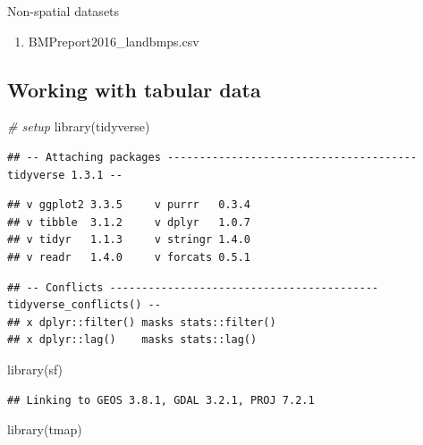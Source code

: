 \documentclass[]{article}
\newenvironment{Shaded}{\begin{snugshade}}{\end{snugshade}}
\newcommand{\CommentTok}[1]{\textcolor[rgb]{0.56,0.35,0.01}{\textit{#1}}}
\newcommand{\FunctionTok}[1]{\textcolor[rgb]{0.00,0.00,0.00}{#1}}
\newcommand{\NormalTok}[1]{#1}
\providecommand{\tightlist}{%
  \setlength{\itemsep}{0pt}\setlength{\parskip}{0pt}}
\begin{document}
Non-spatial datasets

\begin{enumerate}
\def\labelenumi{\arabic{enumi}.}
\tightlist
\item
  BMPreport2016\_landbmps.csv
\end{enumerate}

\hypertarget{working-with-tabular-data}{%
\subsection{Working with tabular data}\label{working-with-tabular-data}}

\begin{Shaded}
\begin{Highlighting}[]
\CommentTok{\# setup}
\FunctionTok{library}\NormalTok{(tidyverse)}
\end{Highlighting}
\end{Shaded}

\begin{verbatim}
## -- Attaching packages --------------------------------------- tidyverse 1.3.1 --
\end{verbatim}

\begin{verbatim}
## v ggplot2 3.3.5     v purrr   0.3.4
## v tibble  3.1.2     v dplyr   1.0.7
## v tidyr   1.1.3     v stringr 1.4.0
## v readr   1.4.0     v forcats 0.5.1
\end{verbatim}

\begin{verbatim}
## -- Conflicts ------------------------------------------ tidyverse_conflicts() --
## x dplyr::filter() masks stats::filter()
## x dplyr::lag()    masks stats::lag()
\end{verbatim}

\begin{Shaded}
\begin{Highlighting}[]
\FunctionTok{library}\NormalTok{(sf)}
\end{Highlighting}
\end{Shaded}

\begin{verbatim}
## Linking to GEOS 3.8.1, GDAL 3.2.1, PROJ 7.2.1
\end{verbatim}

\begin{Shaded}
\begin{Highlighting}[]
\FunctionTok{library}\NormalTok{(tmap)}
\end{Highlighting}
\end{Shaded}
\end{document}
